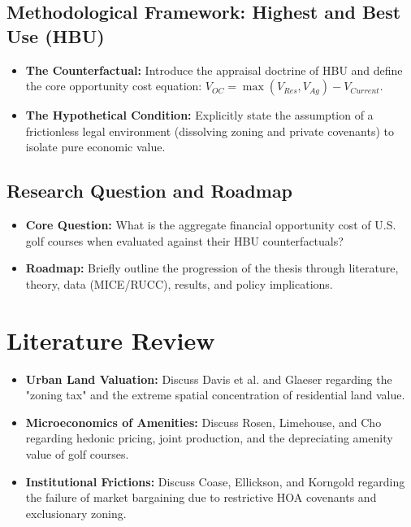 \documentclass[10pt, letterpaper]{article}
\begin{document}
\subsection{Methodological Framework: Highest and Best Use (HBU)}
\begin{itemize}
    \item \textbf{The Counterfactual:} Introduce the appraisal doctrine of HBU and define the core opportunity cost equation: $V_{OC} = \max(V_{Res}, V_{Ag}) - V_{Current}$.
    \item \textbf{The Hypothetical Condition:} Explicitly state the assumption of a frictionless legal environment (dissolving zoning and private covenants) to isolate pure economic value.
\end{itemize}

\subsection{Research Question and Roadmap}
\begin{itemize}
    \item \textbf{Core Question:} What is the aggregate financial opportunity cost of U.S. golf courses when evaluated against their HBU counterfactuals?
    \item \textbf{Roadmap:} Briefly outline the progression of the thesis through literature, theory, data (MICE/RUCC), results, and policy implications.
\end{itemize}

\newpage

\section{Literature Review}
\begin{itemize}
    \item \textbf{Urban Land Valuation:} Discuss Davis et al. and Glaeser regarding the "zoning tax" and the extreme spatial concentration of residential land value.
    \item \textbf{Microeconomics of Amenities:} Discuss Rosen, Limehouse, and Cho regarding hedonic pricing, joint production, and the depreciating amenity value of golf courses.
    \item \textbf{Institutional Frictions:} Discuss Coase, Ellickson, and Korngold regarding the failure of market bargaining due to restrictive HOA covenants and exclusionary zoning.
\end{itemize}
\end{document}

